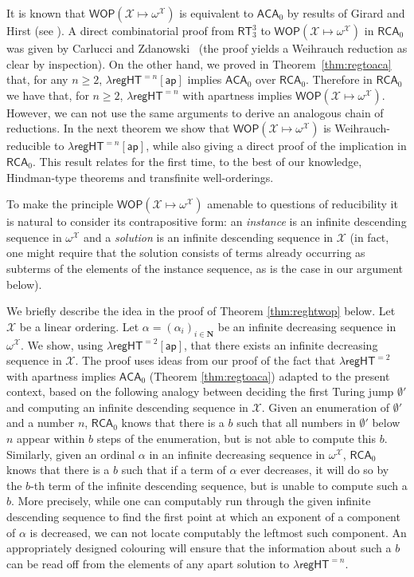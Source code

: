 \documentclass[a4paper,11pt]{article}
\newcommand\Nat{\mathbf{N}}
\newcommand\RCA{\mathsf{RCA}}
\newcommand\ACA{\mathsf{ACA}}
\newcommand\RT{\mathsf{RT}}
\newcommand\regHT{\mathsf{regHT}}
\newcommand\ap{\mathsf{ap}}
\newcommand\ordX{\mathcal{X}}
\newcommand\WOP{\mathsf{WOP}}
\begin{document}
It is known that $\WOP(\ordX \mapsto \omega^\ordX)$ is equivalent to $\ACA_0$ by results of Girard and Hirst
(see \cite{Hir:94}). 
A direct combinatorial proof from $\RT^3_3$ to $\WOP(\ordX \mapsto \omega^\ordX)$ in 
$\RCA_0$ was given by Carlucci and Zdanowski~\cite{Car-Zda:12} (the proof yields a Weihrauch reduction as clear by inspection). On the other hand, we proved in 
Theorem~\ref{thm:regtoaca} that, for any $n \geq 2$, $\lambda\regHT^{= n}[\ap]$ implies $\ACA_0$ over $\RCA_0$. Therefore in $\RCA_0$
we have that, for $n \geq 2$, $\lambda\regHT^{= n}$ with apartness implies $\WOP(\ordX\mapsto \omega^\ordX)$. 
However, we can not use the same arguments to derive an analogous chain of reductions. In the next theorem we show 
that $\WOP(\ordX\mapsto \omega^\ordX)$ is Weihrauch-reducible to $\lambda\regHT^{= n}[\ap]$, 
while also giving a direct proof of the implication in $\RCA_0$. This result relates for the first time, to the best of our knowledge, Hindman-type theorems and transfinite well-orderings.

To make the principle $\WOP(\ordX\mapsto \omega^\ordX)$ amenable to questions of reducibility it is natural to consider its 
contrapositive form: an {\em instance} is an infinite descending sequence in $\omega^\ordX$ and a {\em solution} is an infinite descending sequence in $\ordX$ (in fact, one might require that the solution consists of terms already occurring as subterms of the elements of the instance sequence, as is the case in our argument below).

We briefly describe the idea in the proof of Theorem \ref{thm:reghtwop} below. Let $\ordX$ be a linear ordering. Let $\alpha=(\alpha_i)_{i \in \Nat}$ be an infinite decreasing sequence in $\omega^\ordX$. We show, using $\lambda\regHT^{= 2}[\ap]$, that there exists an infinite decreasing sequence in $\ordX$. The proof uses ideas from our proof of the fact that $\lambda\regHT^{= 2}$ with apartness implies $\ACA_0$ (Theorem \ref{thm:regtoaca}) adapted to the present context, based on the following analogy between deciding the first Turing jump $\emptyset'$ and computing an infinite descending sequence in $\ordX$. Given an enumeration of $\emptyset'$ and a number $n$, $\RCA_0$ knows that there is a $b$ such that all numbers in $\emptyset'$ below $n$ appear within $b$ steps of 
the enumeration, but is not able to compute this $b$. Similarly, given an ordinal $\alpha$ in an infinite decreasing sequence in $\omega^\ordX$, $\RCA_0$ knows that there is a $b$ such that if a term of $\alpha$ ever decreases, it will do so 
by the $b$-th term of the infinite descending sequence, but is unable to compute such a $b$. More precisely, 
while one can computably run through the given infinite descending sequence to find the first point at which an exponent 
of a component of $\alpha$ is decreased, we can not locate computably the leftmost such component. An appropriately 
designed colouring will ensure that the information about such a $b$ can be read off from the elements of any apart solution to $\lambda\regHT^{= n}$. 
\end{document}
